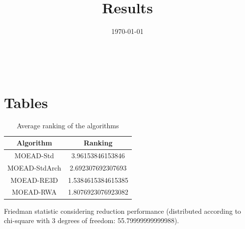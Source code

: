 \documentclass{article}
\title{Results}
\author{}
\date{\today}
\begin{document}
\oddsidemargin 0in \topmargin 0in\maketitle
\
\section{Tables}
\begin{table}[!htp]
\centering
\caption{Average ranking of the algorithms}
\begin{tabular}{c|c}
Algorithm&Ranking\\
\hline
MOEAD-Std&3.96153846153846\\
MOEAD-StdArch&2.692307692307693\\
MOEAD-RE3D&1.5384615384615385\\
MOEAD-RWA&1.8076923076923082\\
\end{tabular}
\end{table}


Friedman statistic considering reduction performance (distributed according to chi-square with 3 degrees of freedom: 55.79999999999988).
\end{document}
